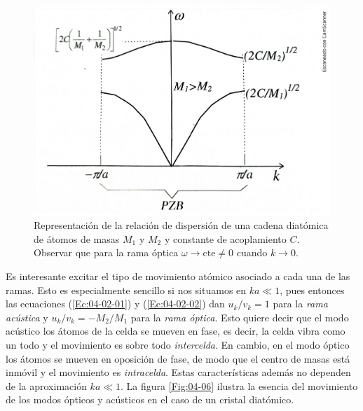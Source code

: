 \begin{figure}[h!] \centering
    \includegraphics[scale=0.43]{Cuerpo/Ch_04/Fotos libro 5.pdf}
    \caption{Representación de la relación de dispersión de una cadena diatómica de átomos de masas $M_1$ y $M_2$ y constante de acoplamiento $C$. Observar que para la rama óptica $\omega \rightarrow \text{cte} \neq 0$ cuando $k\rightarrow 0$.}
    \label{Fig:04-05}
\end{figure}    

Es interesante excitar el tipo de movimiento atómico asociado a cada una de las ramas. Esto es especialmente sencillo si nos situamos en $ka\ll 1$, pues entonces las ecuaciones (\ref{Ec:04-02-01}) y (\ref{Ec:04-02-02}) dan $u_k/v_k=1$ para la \textit{rama acústica} y $u_k/v_k = -M_2/M_1$ para la \textit{rama óptica}. Esto quiere decir que el modo acústico los átomos de la celda se mueven en fase, es decir, la celda vibra como un todo y el movimiento es sobre todo \textit{intercelda}. En cambio, en el modo óptico los átomos se mueven en oposición de fase, de modo que el centro de masas está inmóvil y el movimiento es \textit{intracelda}. Estas características además no dependen de la aproximación $ka\ll 1$. La figura \ref{Fig:04-06} ilustra la esencia del movimiento de los modos ópticos y acústicos en el caso de un cristal diatómico. 

